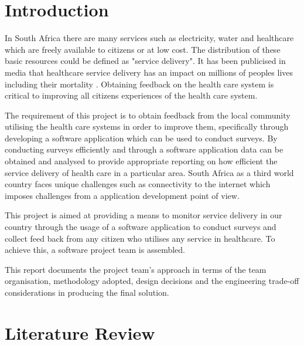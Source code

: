 \documentclass[12pt]{witseiepaper}
\begin{document}
\section{Introduction}
In South Africa there are many services such as electricity, water and healthcare which are freely available to citizens or at low cost. The distribution of these basic resources could be defined as "service delivery". It has been publicised in media that healthcare service delivery has an impact on millions of peoples lives including their mortality \cite{InfantsDie}. Obtaining feedback on the health care system is critical to improving all citizens experiences of the health care system.

The requirement of this project is to obtain feedback from the local community utilising the health care systems in order to improve them, specifically through developing a software application which can be used to conduct surveys. By conducting surveys efficiently and through a software application data can be obtained and analysed to provide appropriate reporting on how efficient the service delivery of health care in a particular area. South Africa as a third world country faces unique challenges such as connectivity to the internet \cite{Internet} which imposes challenges from a application development point of view. 

This project is aimed at providing a means to monitor service delivery in our country through the usage of a software application to conduct surveys and collect feed back from any citizen who utilises any service in healthcare. To achieve this, a software project team is assembled.

This report documents the project team's approach in terms of the team organisation, methodology adopted, design decisions and the engineering trade-off considerations in producing the final solution.


\section{Literature Review}
\end{document}
